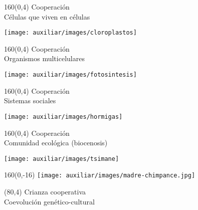 \documentclass[shownotes,aspectratio=169]{beamer}
\begin{document}
\begin{frame}[plain]
\begin{textblock}{160}(0,4)
 \centering \LARGE Cooperación \\
 \Large Células que viven en células
\end{textblock}
\vspace{1.3cm} \centering

\texttt{[image: auxiliar/images/cloroplastos]}

\end{frame}

\begin{frame}[plain]
\begin{textblock}{160}(0,4)
 \centering \LARGE Cooperación \\
 \Large Organismos multicelulares
\end{textblock}
\vspace{1.3cm} \centering

\texttt{[image: auxiliar/images/fotosintesis]}

\end{frame}

\begin{frame}[plain]
\begin{textblock}{160}(0,4)
 \centering \LARGE Cooperación \\
 \Large Sistemas sociales
\end{textblock}
\vspace{1.3cm} \centering

\texttt{[image: auxiliar/images/hormigas]}

\end{frame}

\begin{frame}[plain]
\begin{textblock}{160}(0,4)
 \centering \LARGE Cooperación \\
 \Large Comunidad ecológica (biocenosis)
\end{textblock}
\vspace{1.3cm} \centering

\texttt{[image: auxiliar/images/tsimane]}

\end{frame}

\begin{frame}[plain]

\begin{textblock}{160}(0,-16)
\texttt{[image: auxiliar/images/madre-chimpance.jpg]}
\end{textblock}

\begin{textblock}{80}(80,4)
 \centering \LARGE Crianza cooperativa \\
 \Large Coevolución genético-cultural
\end{textblock}
\vspace{1cm}

\end{frame}
\end{document}
